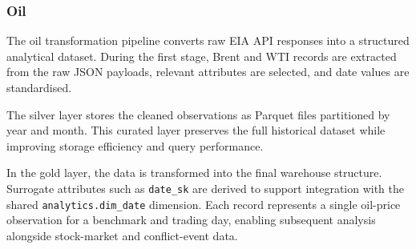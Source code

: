 \documentclass[11pt,a4paper]{article}
\begin{document}
\subsubsection{Oil}
\label{sec:oil_transform}

The oil transformation pipeline converts raw EIA API responses into a
structured analytical dataset. During the first stage, Brent and WTI
records are extracted from the raw JSON payloads, relevant attributes
are selected, and date values are standardised.

The silver layer stores the cleaned observations as Parquet files
partitioned by year and month. This curated layer preserves the full
historical dataset while improving storage efficiency and query
performance.

In the gold layer, the data is transformed into the final warehouse
structure. Surrogate attributes such as \texttt{date\_sk} are derived
to support integration with the shared
\texttt{analytics.dim\_date} dimension. Each record represents a
single oil-price observation for a benchmark and trading day, enabling
subsequent analysis alongside stock-market and conflict-event data.
\end{document}

